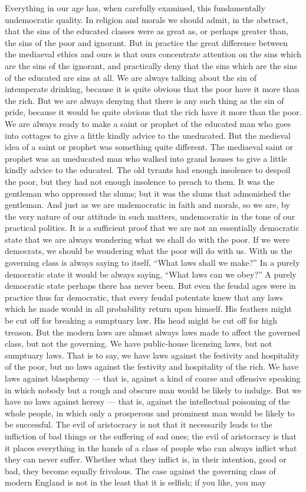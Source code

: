 Everything in our age has, when carefully examined, this fundamentally undemocratic quality. In religion and morals we should admit, in the abstract, that the sins of the educated classes were as great as, or perhaps greater than, the sins of the poor and ignorant. But in practice the great difference between the mediaeval ethics and ours is that ours concentrate attention on the sins which are the sins of the ignorant, and practically deny that the sins which are the sins of the educated are sins at all. We are always talking about the sin of intemperate drinking, because it is quite obvious that the poor have it more than the rich. But we are always denying that there is any such thing as the sin of pride, because it would be quite obvious that the rich have it more than the poor. We are always ready to make a saint or prophet of the educated man who goes into cottages to give a little kindly advice to the uneducated. But the medieval idea of a saint or prophet was something quite different. The mediaeval saint or prophet was an uneducated man who walked into grand houses to give a little kindly advice to the educated. The old tyrants had enough insolence to despoil the poor, but they had not enough insolence to preach to them. It was the gentleman who oppressed the slums; but it was the slums that admonished the gentleman. And just as we are undemocratic in faith and morals, so we are, by the very nature of our attitude in such matters, undemocratic in the tone of our practical politics. It is a sufficient proof that we are not an essentially democratic state that we are always wondering what we shall do with the poor. If we were democrats, we should be wondering what the poor will do with us. With us the governing class is always saying to itself, “What laws shall we make?” In a purely democratic state it would be always saying, “What laws can we obey?” A purely democratic state perhaps there has never been. But even the feudal ages were in practice thus far democratic, that every feudal potentate knew that any laws which he made would in all probability return upon himself. His feathers might be cut off for breaking a sumptuary law. His head might be cut off for high treason. But the modern laws are almost always laws made to affect the governed class, but not the governing. We have public-house licensing laws, but not sumptuary laws. That is to say, we have laws against the festivity and hospitality of the poor, but no laws against the festivity and hospitality of the rich. We have laws against blasphemy — that is, against a kind of coarse and offensive speaking in which nobody but a rough and obscure man would be likely to indulge. But we have no laws against heresy — that is, against the intellectual poisoning of the whole people, in which only a prosperous and prominent man would be likely to be successful. The evil of aristocracy is not that it necessarily leads to the infliction of bad things or the suffering of sad ones; the evil of aristocracy is that it places everything in the hands of a class of people who can always inflict what they can never suffer. Whether what they inflict is, in their intention, good or bad, they become equally frivolous. The case against the governing class of modern England is not in the least that it is selfish; if you like, you may 